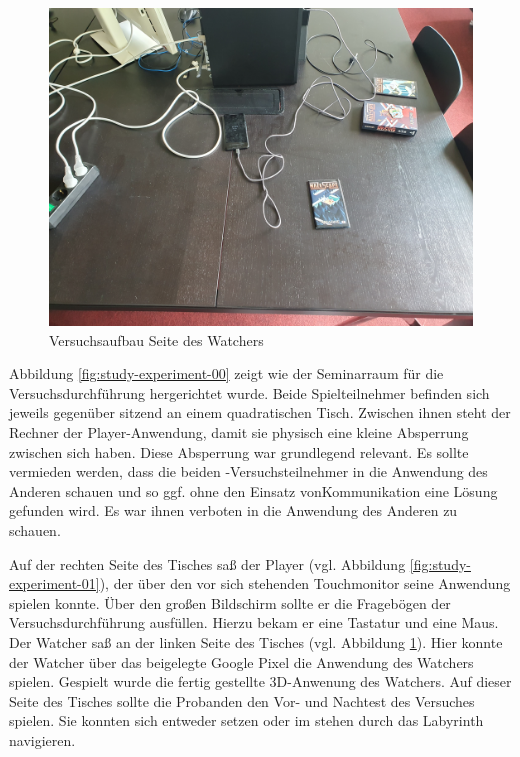 \begin{figure}[ht]
\centering
\includegraphics[width=1\linewidth]{content/pictures/Aufbau_02.jpg}
\caption{Versuchsaufbau Seite des Watchers}
\label{fig:study-experiment-02}
\end{figure}

Abbildung \ref{fig:study-experiment-00} zeigt wie der Seminarraum für die Versuchsdurchführung hergerichtet wurde. Beide Spielteilnehmer befinden sich jeweils gegenüber sitzend an einem quadratischen Tisch. Zwischen ihnen steht der Rechner der Player-Anwendung, damit sie physisch eine kleine Absperrung zwischen sich haben. Diese Absperrung war grundlegend relevant. Es sollte vermieden werden, dass die beiden -Versuchsteilnehmer in die Anwendung des Anderen schauen und so ggf. ohne den Einsatz vonKommunikation eine Lösung gefunden wird. Es war ihnen verboten in die Anwendung des Anderen zu schauen.

Auf der rechten Seite des Tisches saß der Player (vgl. Abbildung \ref{fig:study-experiment-01}), der über den vor sich stehenden Touchmonitor seine Anwendung spielen konnte. Über den großen Bildschirm sollte er die Fragebögen der Versuchsdurchführung ausfüllen. Hierzu bekam er eine Tastatur und eine Maus. Der Watcher saß an der linken Seite des Tisches (vgl. Abbildung \ref{fig:study-experiment-02}). Hier konnte der Watcher über das beigelegte Google Pixel die Anwendung des Watchers spielen. Gespielt wurde die fertig gestellte \ac{3D}-Anwenung des Watchers. Auf dieser Seite des Tisches sollte die Probanden den Vor- und Nachtest des Versuches spielen. Sie konnten sich entweder setzen oder im stehen durch das Labyrinth navigieren.

